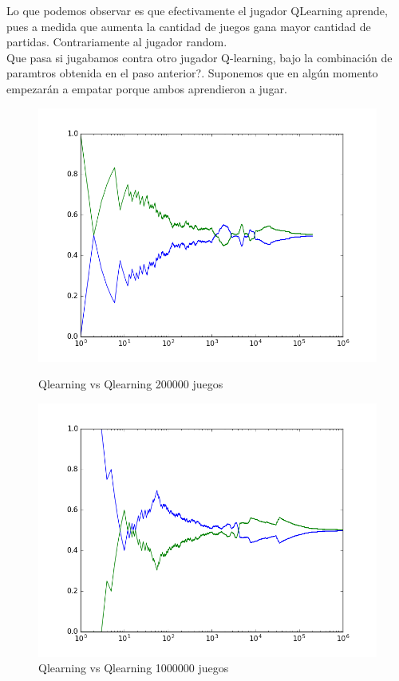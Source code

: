 Lo que podemos observar es que efectivamente el jugador QLearning aprende, pues a medida que aumenta la cantidad de juegos
 gana mayor cantidad de partidas. Contrariamente al jugador random.  \\

Que pasa si jugabamos contra otro jugador Q-learning, bajo la combinación de paramtros obtenida en el paso anterior?.
 Suponemos que en algún momento empezarán a empatar porque ambos aprendieron a jugar.\\

\begin{figure}[h]
 \centering
 \begin{minipage}{.45\textwidth}
	\centering
	\includegraphics[scale=0.35]{img/QlearningQlearningEgreedy200000.png}
        \caption{Qlearning vs Qlearning 200000 juegos}
  \end{minipage}
 \begin{minipage}{.5\textwidth}
	\centering
	\includegraphics[scale=0.35]{img/QlearningQlearningEgreedy1000000.png}
        \caption{Qlearning vs Qlearning 1000000 juegos}
  \end{minipage}
\end{figure}


